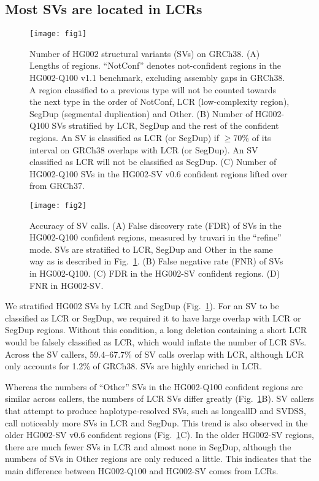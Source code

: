 \documentclass[a4paper,num-refs]{oup-contemporary}
\begin{document}
\subsection{Most SVs are located in LCRs}

\begin{figure}[tb]
\texttt{[image: fig1]}
\caption{Number of HG002 structural variants (SVs) on GRCh38.
(A) Lengths of regions.
``NotConf'' denotes not-confident regions in the HG002-Q100 v1.1 benchmark, excluding assembly gaps in GRCh38.
A region classified to a previous type will not be counted towards the next type
in the order of NotConf, LCR (low-complexity region), SegDup (segmental duplication) and Other.
(B) Number of HG002-Q100 SVs stratified by LCR, SegDup and the rest of the confident regions.
An SV is classified as LCR (or SegDup) if $\ge$70\% of its interval on GRCh38 overlaps with LCR (or SegDup).
An SV classified as LCR will not be classified as SegDup.
(C) Number of HG002-Q100 SVs in the HG002-SV v0.6 confident regions lifted over from GRCh37.}\label{fig:count}
\end{figure}

\begin{figure}[!tb]
\texttt{[image: fig2]}
\caption{Accuracy of SV calls.
(A) False discovery rate (FDR) of SVs in the HG002-Q100 confident regions, measured by truvari in the ``refine'' mode.
SVs are stratified to LCR, SegDup and Other in the same way as is described in Fig.~\ref{fig:count}.
(B) False negative rate (FNR) of SVs in HG002-Q100.
(C) FDR in the HG002-SV confident regions.
(D) FNR in HG002-SV.}\label{fig:acc}
\end{figure}

We stratified HG002 SVs by LCR and SegDup (Fig.~\ref{fig:count}).
For an SV to be classified as LCR or SegDup, we required it to have large overlap with LCR or SegDup regions.
Without this condition, a long deletion containing a short LCR would be falsely classified as LCR, which would inflate the number of LCR SVs.
Across the SV callers, 59.4--67.7\% of SV calls overlap with LCR, although LCR only accounts for 1.2\% of GRCh38.
SVs are highly enriched in LCR.

Whereas the numbers of ``Other'' SVs in the HG002-Q100 confident regions are similar across callers,
the numbers of LCR SVs differ greatly (Fig.~\ref{fig:count}B).
SV callers that attempt to produce haplotype-resolved SVs, such as longcallD and SVDSS, call noticeably more SVs in LCR and SegDup.
This trend is also observed in the older HG002-SV v0.6 confident regions (Fig.~\ref{fig:count}C).
In the older HG002-SV regions, there are much fewer SVs in LCR and almost none in SegDup, although the numbers of SVs
in Other regions are only reduced a little.
This indicates that the main difference between HG002-Q100 and HG002-SV comes from LCRs.
\end{document}
